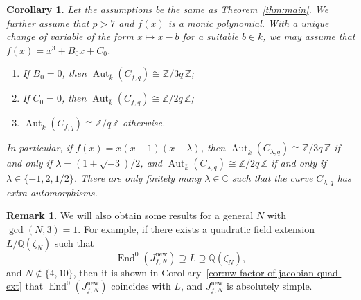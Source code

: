 \documentclass{amsart}[11pt]
\newtheorem{cor}[thm]{Corollary}
\theoremstyle{definition}
\newtheorem{rem}[thm]{Remark}
\numberwithin{equation}{section}
\theoremstyle{notitle}
\begin{document}
\begin{cor}\label{cor:automorphism}
  Let the assumptions be the same as Theorem~\ref{thm:main}. We
  further assume that $p>7$ and $f(x)$ is a monic polynomial. With a
  unique change of variable of the form $x\mapsto x-b$ for a suitable
  $b\in k$, we may assume that $f(x)= x^3+B_0x +C_0$.
  \begin{enumerate}
  \item If $B_0=0$, then $\operatorname{Aut}_{\bar{k}}(C_{f,q})\cong {\mathbb{Z}/ {3q}\, \mathbb{Z}}$;
  \item If $C_0=0$, then $\operatorname{Aut}_{\bar{k}}(C_{f,q})\cong {\mathbb{Z}/ {2q}\, \mathbb{Z}}$;
  \item $\operatorname{Aut}_{\bar{k}}(C_{f,q})\cong {\mathbb{Z}/ {q}\, \mathbb{Z}}$ otherwise.
  \end{enumerate}
In particular, if $f(x)=x(x-1)(x-\lambda)$, then
$\operatorname{Aut}_{\bar{k}}(C_{\lambda,q})\cong{\mathbb{Z}/ {3q}\, \mathbb{Z}}$ if and only if $\lambda =
(1\pm \sqrt{-3})/2$, and $\operatorname{Aut}_{\bar{k}}(C_{\lambda,q})\cong{\mathbb{Z}/ {2q}\, \mathbb{Z}}$ if
and only if $\lambda\in \{ -1, 2, 1/2\}$. There are only finitely many
$\lambda\in {\mathbb{C}}$ such that the curve $C_{\lambda,q}$ has extra
automorphisms. 
\end{cor}

\begin{rem}
  We will also obtain some results for a general $N$ with $\gcd(N,3)=1$.
  For example, if  there exists a quadratic field extension
  $L/{\mathbb{Q}}(\zeta_N)$ such that
  \[\operatorname{End}^0(J_{f,N}^{\mathrm{new}})\supseteq L \supseteq {\mathbb{Q}}(\zeta_N),\]
  and $N\not\in \{4, 10\}$, then it is shown  in
  Corollary~\ref{cor:nw-factor-of-jacobian-quad-ext} that
  $\operatorname{End}^0(J_{f,N}^{\mathrm{new}})$ coincides with $L$, and $J_{f,N}^{\mathrm{new}}$ is
  absolutely simple.

  
  
  
  
\end{rem}
\end{document}
